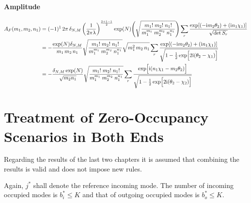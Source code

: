 \documentclass[
	english,
	a4paper,
	fontsize=10pt,
	parskip=half,
	titlepage=true,
	DIV=12,
	final
]{scrreprt}
\newcommand*{\iunit}{\ensuremath{\mathrm{i}}}
\begin{document}
\subsubsection{Amplitude}
\begin{align}
	A_F(m_1, m_2, n_1)
&=
	(-1)^1 \, 2\pi \, \delta_{N,M} \, \qty(
		\frac{1}{2\pi\lambda}
	)^{\frac{2 + 1 - 1}{2}}
	\exp(N)
	\qty(
		\sqrt{\frac
			{ m_1!      \; m_2!     \; n_1! }
			{ m_1^{m_1} \;m_2^{m_2} \; n_1^{n_1} }
	})
	\sum_r
		\frac
		{\exp[
			\qty(- \iunit m_2 \theta_2) + 
			\qty(  \iunit n_1 \chi  _1)
		]}
		{\sqrt{\det S_r}}
	\\
&=
\nonumber
	-\frac
		{\exp(N) \delta_{N,M}}
		{m_1 \, m_2 \, n_1}
	\sqrt{\frac
		{ m_1!      \; m_2!     \; n_1! }
		{ m_1^{m_1} \;m_2^{m_2} \; n_1^{n_1} }
	}
	\sqrt{m_1^2 \, m_2 \, n_1}
	\sum_r
		\frac
		{\exp[
			\qty(- \iunit m_2 \theta_2) + 
			\qty(  \iunit n_1 \chi  _1)
		]}
		{\sqrt{1 - \frac{1}{2} \exp[\Big. 2\iunit (\theta_2 - \chi_1)]}}
	\\
&=
	-\frac
		{\delta_{N,M} \exp(N)}
		{\sqrt{m_2 n_1}}
	\sqrt{\frac
		{ m_1!      \; m_2!     \; n_1! }
		{ m_1^{m_1} \;m_2^{m_2} \; n_1^{n_1} }
	}
	\sum_r \frac
		{\exp[ \Big. \iunit
			\qty( n_1 \chi_1 - m_2 \theta_2 )
		]}
		{\sqrt{1 - \frac{1}{2} \exp[\Big. 2\iunit (\theta_2 - \chi_2)]}}
\end{align}

\chapter{Treatment of Zero-Occupancy Scenarios in Both Ends}
Regarding the results of the last two chapters it is assumed that combining the results is valid and does not impose new rules.

Again, $j^*$ shall denote the reference incoming mode. The number of incoming occupied modes is 
$b_i^* \leq K$ and that of outgoing occupied modes is $b_o^* \leq K$.
\end{document}
